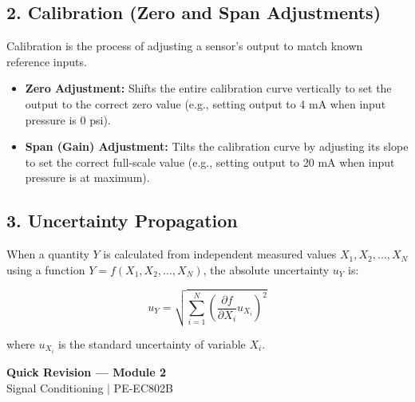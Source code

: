 \documentclass[12pt,a4paper]{article}
\begin{document}
\subsection{2. Calibration (Zero and Span Adjustments)}
Calibration is the process of adjusting a sensor's output to match known reference inputs.
\begin{itemize}[leftmargin=*, itemsep=2.5pt]
  \item \textbf{Zero Adjustment:} Shifts the entire calibration curve vertically to set the output to the correct zero value (e.g., setting output to 4 mA when input pressure is 0 psi).
  \item \textbf{Span (Gain) Adjustment:} Tilts the calibration curve by adjusting its slope to set the correct full-scale value (e.g., setting output to 20 mA when input pressure is at maximum).
\end{itemize}

\subsection{3. Uncertainty Propagation}
When a quantity $Y$ is calculated from independent measured values $X_1, X_2, \dots, X_N$ using a function $Y = f(X_1, X_2, \dots, X_N)$, the absolute uncertainty $u_Y$ is:
\begin{tcolorbox}[formulabox, title={\textbf{Uncertainty Propagation Equation}}]
\[
u_Y = \sqrt{\sum_{i=1}^N \left(\frac{\partial f}{\partial X_i} u_{X_i}\right)^2}
\]
\end{tcolorbox}
where $u_{X_i}$ is the standard uncertainty of variable $X_i$.

\newpage

\begin{center}
  {\large\bfseries\color{myred} Quick Revision --- Module 2}\\[3pt]
  {\small\color{mydark} Signal Conditioning $|$ PE-EC802B}
\end{center}
\noindent{\color{myred}\rule{\linewidth}{1.2pt}}
\vspace{4pt}
\end{document}
